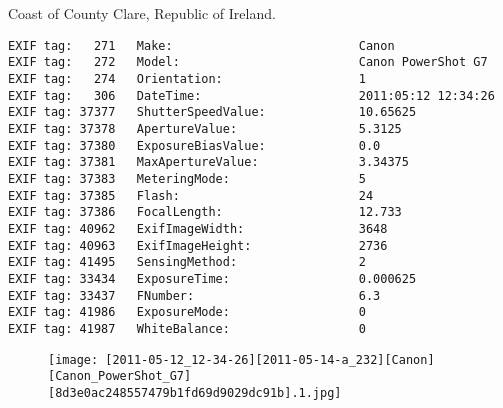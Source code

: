 \section{\protect{}}
\noindent Coast of County Clare, Republic of Ireland.
\noindent
\begin{lstlisting}
EXIF tag:   271   Make:                          Canon
EXIF tag:   272   Model:                         Canon PowerShot G7
EXIF tag:   274   Orientation:                   1
EXIF tag:   306   DateTime:                      2011:05:12 12:34:26
EXIF tag: 37377   ShutterSpeedValue:             10.65625
EXIF tag: 37378   ApertureValue:                 5.3125
EXIF tag: 37380   ExposureBiasValue:             0.0
EXIF tag: 37381   MaxApertureValue:              3.34375
EXIF tag: 37383   MeteringMode:                  5
EXIF tag: 37385   Flash:                         24
EXIF tag: 37386   FocalLength:                   12.733
EXIF tag: 40962   ExifImageWidth:                3648
EXIF tag: 40963   ExifImageHeight:               2736
EXIF tag: 41495   SensingMethod:                 2
EXIF tag: 33434   ExposureTime:                  0.000625
EXIF tag: 33437   FNumber:                       6.3
EXIF tag: 41986   ExposureMode:                  0
EXIF tag: 41987   WhiteBalance:                  0

\end{lstlisting}
\clearpage
\begin{figure}
\raggedleft
\texttt{[image: [2011-05-12\_12-34-26][2011-05-14-a\_232][Canon][Canon\_PowerShot\_G7][8d3e0ac248557479b1fd69d9029dc91b].1.jpg]}
\end{figure}


\clearpage
